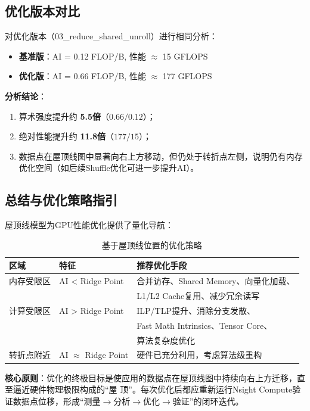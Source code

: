 \subsection{优化版本对比} 对优化版本（03\_reduce\_shared\_unroll）进行相同分析：
\begin{itemize}
    \item \textbf{基准版}：AI = 0.12 FLOP/B, 性能 $\approx$ 15 GFLOPS
    \item \textbf{优化版}：AI = 0.66 FLOP/B, 性能 $\approx$ 177 GFLOPS
\end{itemize}
\textbf{分析结论}：
\begin{enumerate}
    \item 算术强度提升约 \textbf{5.5倍}（$0.66 / 0.12$）；
    \item 绝对性能提升约 \textbf{11.8倍}（$177 / 15$）；
    \item 数据点在屋顶线图中显著向右上方移动，但仍处于转折点左侧，说明仍有内存优化空间（如后续Shuffle优化可进一步提升AI）。
\end{enumerate}

\subsection{总结与优化策略指引}

屋顶线模型为GPU性能优化提供了量化导航：
\begin{table}[h]
\centering
\caption{基于屋顶线位置的优化策略}
\begin{tabular}{@{}lll@{}}
\toprule
\textbf{区域} & \textbf{特征} & \textbf{推荐优化手段} \\ \midrule
内存受限区 & AI < Ridge Point & 合并访存、Shared Memory、向量化加载、\\
& & L1/L2 Cache复用、减少冗余读写 \\ \midrule
计算受限区 & AI > Ridge Point & ILP/TLP提升、消除分支发散、\\
& & Fast Math Intrinsics、Tensor Core、\\
& & 算法复杂度优化 \\ \midrule
转折点附近 & AI $\approx$ Ridge Point & 硬件已充分利用，考虑算法级重构 \\
\bottomrule
\end{tabular}
\end{table}

\textbf{核心原则}：优化的终极目标是使应用的数据点在屋顶线图中持续向右上方迁移，直至逼近硬件物理极限构成的``屋
顶''。每次优化后都应重新运行Nsight Compute验证数据点位移，形成``测量$\to$分析$\to$优化$\to$验证''的闭环迭代。
